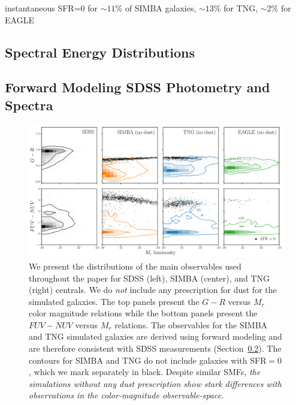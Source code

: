 instantaneous SFR=0 for $\sim11\%$ of SIMBA galaxies, $\sim13\%$ for TNG,
$\sim2\%$ for EAGLE

\subsection{Spectral Energy Distributions} \label{sec:sed}

\subsection{Forward Modeling SDSS Photometry and Spectra} \label{sec:fm} 


\begin{figure}
\begin{center}
\includegraphics[width=\textwidth]{figs/observables.pdf} 
    \caption{We present the distributions of the main observables used
    throughout the paper for SDSS (left), SIMBA (center), and TNG (right)
    centrals. We do {\em not} include any prescription for dust for the
    simulated galaxies. The top panels
    present the $G-R$ versus $M_r$ color magnitude relations while the bottom
    panels present the $FUV-NUV$ versus $M_r$ relations. The observables for
    the SIMBA and TNG simulated galaxies are derived using forward modeling and
    are therefore consistent with SDSS measurements (Section~\ref{sec:fm}). The
    contours for SIMBA and TNG do not include galaxies with SFR$=0$, which we
    mark separately in black. Despite similar SMFs,  {\em the simulations
    without any dust prescription show stark differences with observations in
    the color-magnitude observable-space.} 
    }
\label{fig:obs}
\end{center}
\end{figure}
